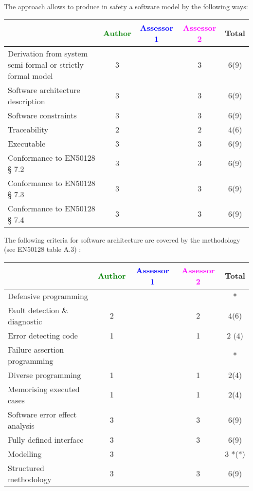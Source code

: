 The approach allows to  produce in safety a software model by the following ways:

\begin{tabular}{|l | c | c | c | c|}
\hline
& \textcolor{green}{Author} & \textcolor{blue}{Assessor 1} & \textcolor{magenta}{Assessor 2} & Total \\
\hline
Derivation from system semi-formal or strictly formal model  & 3     & & 3     &  6(9) \\
\hline 
Software architecture description  & 3     & & 3     &  6(9) \\
\hline
Software constraints  & 3     & & 3     &  6(9) \\
\hline
Traceability  & 2     & & 2     &  4(6) \\
\hline
Executable  & 3     & & 3     &  6(9) \\
\hline
Conformance to EN50128 § 7.2  & 3     & & 3     &  6(9) \\
\hline
Conformance to EN50128 § 7.3  & 3     & & 3     &  6(9) \\
\hline
Conformance to EN50128 § 7.4  & 3     & & 3     &  6(9) \\
\hline
\end{tabular}

The following criteria for software architecture are covered by the methodology
(see EN50128 table A.3) :

\begin{tabular}{|l | c | c | c | c|}
\hline
& \textcolor{green}{Author} & \textcolor{blue}{Assessor 1} & \textcolor{magenta}{Assessor 2} & Total \\
\hline
Defensive programming  & & & & * \\
\hline 
Fault detection \& diagnostic  & 2     & & 2     &  4(6) \\
\hline
Error detecting code  & 1     & & 1     & 2 (4) \\
\hline
Failure assertion programming & & & &  * \\
\hline
Diverse programming & 1     & & 1     &  2(4)  \\
\hline
Memorising executed cases & 1     & & 1     &   2(4) \\
\hline
Software error effect analysis & 3     & & 3     &  6(9) \\
\hline
Fully defined interface & 3     & & 3     &  6(9) \\
\hline
Modelling  & 3     & & & 3 *(*) \\
\hline
Structured methodology & 3     & & 3     &  6(9) \\
\hline
\end{tabular}

